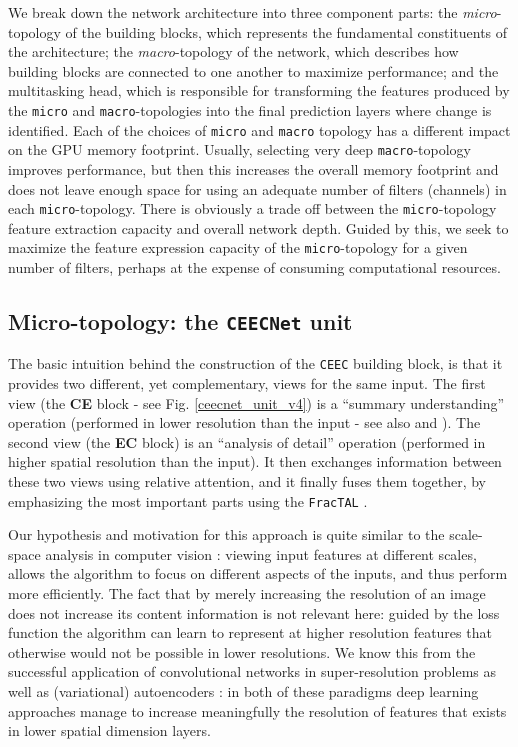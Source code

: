 \documentclass[times, 5p]{elsarticle}
\def \FracTAL {\texttt{FracTAL} }
\begin{document}
We break down the network architecture into three component parts: the \emph{micro}-topology of the building blocks, which represents the fundamental constituents of the architecture; the \emph{macro}-topology of the network, which describes how building blocks are connected to one another to maximize performance; and the multitasking head, which is responsible for transforming the features produced by the \texttt{micro} and \texttt{macro}-topologies into the final prediction layers where change is identified.
Each of the choices of \texttt{micro} and \texttt{macro} topology has a different impact on the GPU memory footprint.
Usually, selecting very deep \texttt{macro}-topology improves performance, but then this increases the overall memory footprint and does not leave enough space for using an adequate number of filters (channels) in each \texttt{micro}-topology. 
There is obviously a trade off between the \texttt{micro}-topology feature extraction capacity and overall network depth. Guided by this, we seek to maximize the feature expression capacity of the \texttt{micro}-topology  for a given number of filters, perhaps at the expense of consuming computational resources. 


\subsection{Micro-topology: the \texttt{CEECNet} unit}
\label{micro_ceecnet_ref}

The basic intuition behind the construction of the \texttt{CEEC} building block, is that it provides two different, yet complementary, views for the same input. The first view (the \textbf{CE} block - see Fig. \ref{ceecnet_unit_v4})  is a ``summary understanding'' operation (performed in lower resolution than the input - see also \citealt{DBLP:journals/corr/NewellYD16,doi:10.1080/01431161.2020.1734251} and \citealt{Qin_2020}). 
The second view (the \textbf{EC} block)  is an ``analysis of detail'' operation (performed in higher spatial resolution than the input). It then exchanges information between these two views using relative attention, and it finally fuses them together, by emphasizing the most important parts using the \FracTAL. 

Our hypothesis and motivation for this approach is quite similar to the scale-space analysis in computer vision \citep{10.5555/528688}: viewing input features at different scales, allows the algorithm to focus on different aspects of the inputs, and thus perform more efficiently. The fact that by merely increasing the resolution of an image does not increase its content information is not relevant here: guided by the loss function the algorithm can learn to represent at higher resolution features that otherwise would not be possible in lower resolutions. We know this from the successful application of convolutional networks in super-resolution problems \citep{DBLP:journals/corr/abs-1902-06068} as well as (variational) autoencoders \citep{DBLP:journals/corr/abs-1812-05069,DBLP:journals/corr/abs-1906-02691}: in both of these paradigms deep learning approaches manage to increase meaningfully the resolution of features that exists in lower spatial dimension layers. 
\end{document}
